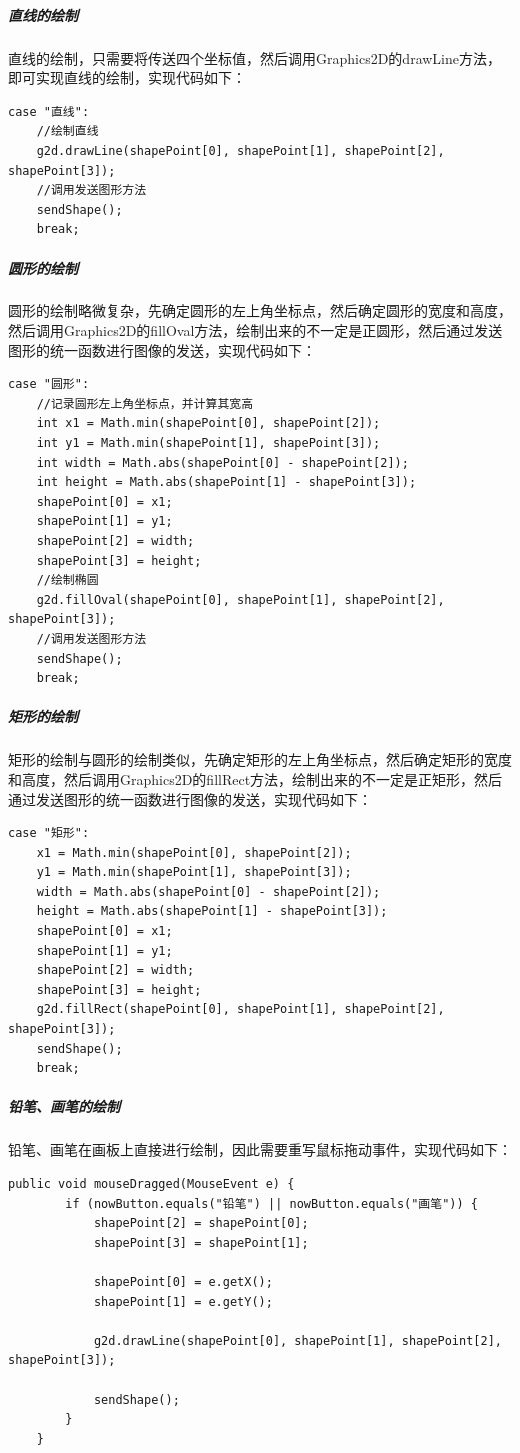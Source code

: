 \documentclass[UTF8,12pt]{article}
\begin{document}
\subparagraph{直线的绘制}
直线的绘制，只需要将传送四个坐标值，然后调用Graphics2D的drawLine方法，即可实现直线的绘制，实现代码如下：
\begin{lstlisting}[title=直线的绘制,frame=shadowbox]
    case "直线":
    //绘制直线
    g2d.drawLine(shapePoint[0], shapePoint[1], shapePoint[2], shapePoint[3]);
    //调用发送图形方法
    sendShape();
    break;
\end{lstlisting}

\subparagraph{圆形的绘制}
圆形的绘制略微复杂，先确定圆形的左上角坐标点，然后确定圆形的宽度和高度，然后调用Graphics2D的fillOval方法，绘制出来的不一定是正圆形，然后通过发送图形的统一函数进行图像的发送，实现代码如下：
\begin{lstlisting}[title=圆形的绘制,frame=shadowbox]
    case "圆形":
    //记录圆形左上角坐标点，并计算其宽高
    int x1 = Math.min(shapePoint[0], shapePoint[2]);
    int y1 = Math.min(shapePoint[1], shapePoint[3]);
    int width = Math.abs(shapePoint[0] - shapePoint[2]);
    int height = Math.abs(shapePoint[1] - shapePoint[3]);
    shapePoint[0] = x1;
    shapePoint[1] = y1;
    shapePoint[2] = width;
    shapePoint[3] = height;
    //绘制椭圆
    g2d.fillOval(shapePoint[0], shapePoint[1], shapePoint[2], shapePoint[3]);
    //调用发送图形方法
    sendShape();
    break;
\end{lstlisting}

\subparagraph{矩形的绘制}
矩形的绘制与圆形的绘制类似，先确定矩形的左上角坐标点，然后确定矩形的宽度和高度，然后调用Graphics2D的fillRect方法，绘制出来的不一定是正矩形，然后通过发送图形的统一函数进行图像的发送，实现代码如下：
\begin{lstlisting}[title=矩形的绘制,frame=shadowbox]
    case "矩形":
    x1 = Math.min(shapePoint[0], shapePoint[2]);
    y1 = Math.min(shapePoint[1], shapePoint[3]);
    width = Math.abs(shapePoint[0] - shapePoint[2]);
    height = Math.abs(shapePoint[1] - shapePoint[3]);
    shapePoint[0] = x1;
    shapePoint[1] = y1;
    shapePoint[2] = width;
    shapePoint[3] = height;
    g2d.fillRect(shapePoint[0], shapePoint[1], shapePoint[2], shapePoint[3]);
    sendShape();
    break;
\end{lstlisting}

\subparagraph{铅笔、画笔的绘制}
铅笔、画笔在画板上直接进行绘制，因此需要重写鼠标拖动事件，实现代码如下：
\begin{lstlisting}[title=铅笔、画笔的绘制,frame=shadowbox]
    public void mouseDragged(MouseEvent e) {
        if (nowButton.equals("铅笔") || nowButton.equals("画笔")) {
            shapePoint[2] = shapePoint[0];
            shapePoint[3] = shapePoint[1];

            shapePoint[0] = e.getX();
            shapePoint[1] = e.getY();

            g2d.drawLine(shapePoint[0], shapePoint[1], shapePoint[2], shapePoint[3]);

            sendShape();
        }
    }
\end{lstlisting}
\end{document}
